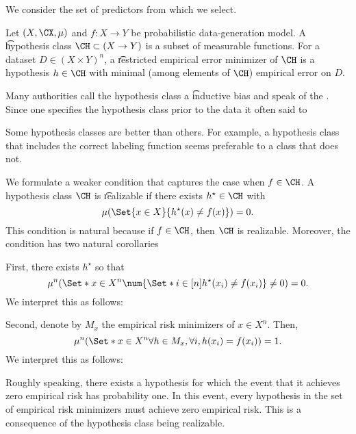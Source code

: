 

We consider the set of predictors from which we select.


Let $(X, \CX, \mu)$ and $f: X \to Y$ be probabilistic data-generation model.
A \t{hypothesis class} $\CH \subset (X \to Y)$ is a subset of measurable functions.
For a dataset $D \in (X \times Y)^n$, a \t{restricted empirical error minimizer} of $\CH$ is a hypothesis $h \in \CH$ with minimal (among elements of $\CH$) empirical error on $D$.


Many authorities call the hypothesis class a \t{inductive bias} and speak of  the .
Since one specifies the hypothesis class prior to the data it often said to 


Some hypothesis classes are better than others.
For example, a hypothesis class that includes the correct labeling function seems preferable to a class that does not.

We formulate a weaker condition that captures the case when $f \in \CH$.
A hypothesis class $\CH$ is \t{realizable} if there exists $h^{\star} \in \CH$ with
\[
	\mu(\Set{x \in X}{h^\star(x) \neq f(x)}) = 0.%
\]
This condition is natural because if $f \in \CH$, then $\CH$ is realizable.
Moreover, the condition has two natural corollaries

First, there exists $h^\star$ so that
\[
	\mu^n(\Set*{x \in X^n}{\num{\Set*{i \in [n]}{h^\star(x_i) \neq f(x_i)}} \neq 0}) = 0.
\]
We interpret this as follows: 

Second, denote by $M_x$ the empirical risk minimizers of $x \in X^n$. Then,
\[
	\mu^n(\Set*{x \in X^n}{\forall h \in M_x, \forall i, h(x_i) = f(x_i)}) = 1.
\]
We interpret this as follows: 

Roughly speaking, there exists a hypothesis for which the event that it achieves zero empirical risk has probability one.
In this event, every hypothesis in the set of empirical risk minimizers must achieve zero empirical risk.
This is a consequence of the hypothesis class being realizable.
